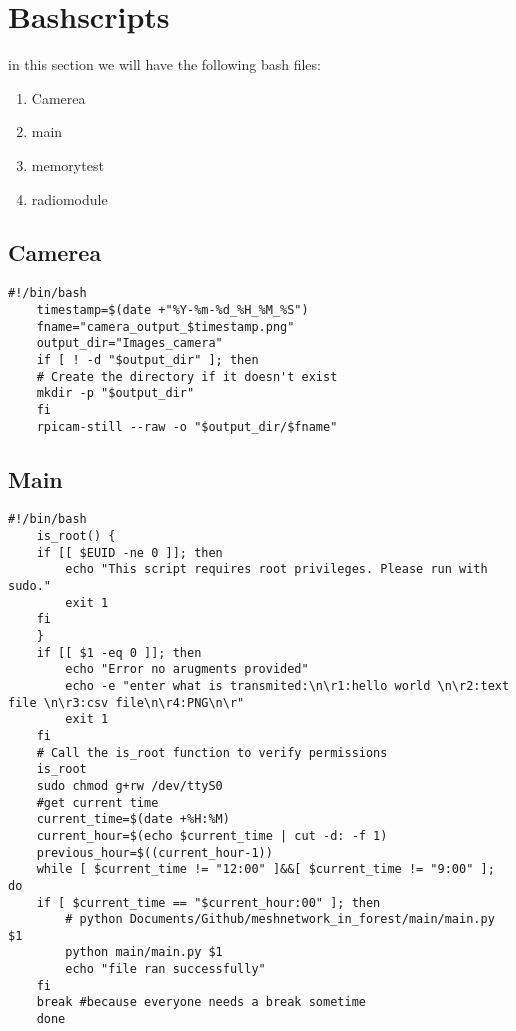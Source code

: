 \section{Bashscripts}
in this section we  will have  the following bash files:
\begin{enumerate}
    \item Camerea
    \item main
    \item memorytest
    \item radiomodule
\end{enumerate}
\subsection{Camerea}
\begin{lstlisting}[style=bashstyle,caption={Code for triggering the camerea}]
    #!/bin/bash
    timestamp=$(date +"%Y-%m-%d_%H_%M_%S")
    fname="camera_output_$timestamp.png"
    output_dir="Images_camera"
    if [ ! -d "$output_dir" ]; then
    # Create the directory if it doesn't exist
    mkdir -p "$output_dir"
    fi
    rpicam-still --raw -o "$output_dir/$fname"
\end{lstlisting}
\newpage
\subsection{Main}
\begin{lstlisting}[style=bashstyle,caption={Code for runing the main function}]
    #!/bin/bash
    is_root() {
    if [[ $EUID -ne 0 ]]; then
        echo "This script requires root privileges. Please run with sudo."
        exit 1
    fi
    }
    if [[ $1 -eq 0 ]]; then
        echo "Error no arugments provided"
        echo -e "enter what is transmited:\n\r1:hello world \n\r2:text file \n\r3:csv file\n\r4:PNG\n\r"
        exit 1
    fi
    # Call the is_root function to verify permissions
    is_root
    sudo chmod g+rw /dev/ttyS0
    #get current time
    current_time=$(date +%H:%M)
    current_hour=$(echo $current_time | cut -d: -f 1)
    previous_hour=$((current_hour-1))
    while [ $current_time != "12:00" ]&&[ $current_time != "9:00" ]; do
    if [ $current_time == "$current_hour:00" ]; then
        # python Documents/Github/meshnetwork_in_forest/main/main.py $1
        python main/main.py $1
        echo "file ran successfully"
    fi
    break #because everyone needs a break sometime 
    done
\end{lstlisting}
\newpage
